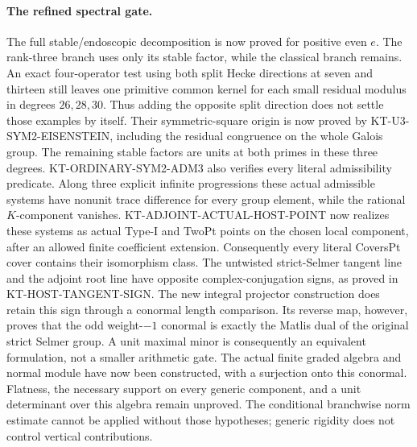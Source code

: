 \paragraph{The refined spectral gate.}
The full stable/endoscopic decomposition is now proved for positive
even $e$. The rank-three branch uses only its stable factor, while
the classical branch remains. An exact four-operator test using
both split Hecke directions at seven and thirteen still leaves
one primitive common kernel for each small residual modulus in
degrees $26,28,30$. Thus adding the opposite split direction does
not settle those examples by itself. Their symmetric-square
origin is now proved by KT-U3-SYM2-EISENSTEIN, including the
residual congruence on the whole Galois group. The remaining
stable factors are units at both primes in these three degrees.
KT-ORDINARY-SYM2-ADM3 also verifies every literal admissibility
predicate. Along three explicit infinite progressions these
actual admissible systems have nonunit trace difference for
every group element, while the rational $K$-component vanishes.
KT-ADJOINT-ACTUAL-HOST-POINT now realizes these systems as
actual Type-I and TwoPt points on the chosen local component,
after an allowed finite coefficient extension. Consequently
every literal CoversPt cover contains their isomorphism class.
The untwisted strict-Selmer tangent line and the adjoint root
line have opposite complex-conjugation signs, as proved in
KT-HOST-TANGENT-SIGN. The new integral projector construction
does retain this sign through a conormal length comparison.
Its reverse map, however, proves that the odd weight-$-1$
conormal is exactly the Matlis dual of the original strict
Selmer group. A unit maximal minor is consequently an
equivalent formulation, not a smaller arithmetic gate.
The actual finite graded algebra and normal module have now
been constructed, with a surjection onto this conormal.
Flatness, the necessary support on every generic component,
and a unit determinant over this algebra remain unproved.
The conditional branchwise norm estimate cannot be applied
without those hypotheses; generic rigidity does not control
vertical contributions.

